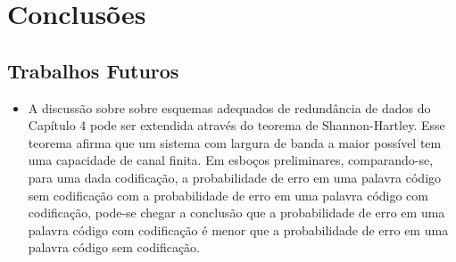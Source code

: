 \chapter{Conclusões}


\section{Trabalhos Futuros}

\begin{itemize}

   \item A discussão sobre sobre esquemas adequados de redundância de dados do Capítulo 4 pode ser extendida através do teorema de Shannon-Hartley. Esse teorema afirma que um sistema com largura de banda a maior possível tem uma capacidade de canal finita. Em esboços preliminares, comparando-se,  para uma dada codificação, a probabilidade de erro em uma palavra código sem codificação com a probabilidade de erro em uma palavra código com codificação, pode-se chegar a conclusão que a probabilidade de erro em uma palavra código com codificação é menor que a probabilidade de erro em uma palavra código sem codificação.

\end{itemize}
